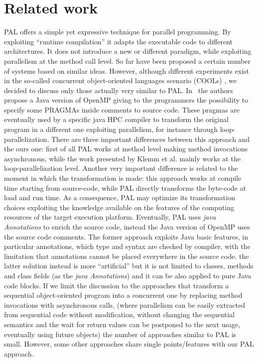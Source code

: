 \documentclass{acm_proc_article-sp}
\begin{document}
\section{Related work}\label{sec:rwork}
PAL offers a simple yet expressive technique for parallel programming. By exploiting ``runtime compilation'' it adapts the executable code to different architectures. It does not introduce a new or different paradigm, while exploiting parallelism at the method call level. So far have been proposed a certain number of systems based on similar ideas.
However, although different experiments exist in the so-called concurrent object-oriented languages scenario (COOLs) \cite{philippsen00survey}, we decided to discuss only those actually very similar to PAL.
In \cite{JavaOpenMP}\ the authors propose a Java version of OpenMP giving to the programmers the possibility to specify some PRAGMAs inside comments to source code. These pragmas are eventually used by a specific java HPC compiler to transform the original program in a different one exploiting parallelism, for instance through loop-parallelization.
There are three important differences between this approach and the ours one: first of all PAL works at method level making method invocations asynchronous, while the work presented by Klemm et al. mainly works at the loop-parallelization level. Another very important difference is related to the moment in which the transformation is made: this approach works at compile time starting from source-code, while PAL directly transforms the byte-code at load and run time. As a consequence, PAL may optimize its transformation choices exploiting the knowledge available on the features of the computing resources of the target execution platform.
Eventually, PAL uses \textit{java Annotations} to enrich the source code, instead the Java version of OpenMP uses the source code comments. 
The former approach exploits Java basic features, in particular annotations, which type and syntax are checked by compiler, with the limitation that annotations cannot be placed everywhere in the source code. the latter solution instead is more ``artificial'' but it is not limited to classes, methods and class fields (as the \textit{java Annotations}) and it can be also applied to pure Java code blocks.
If we limit the discussion to the approaches that transform a sequential object-oriented program into a concurrent one by replacing method invocations with asynchronous calls, (where parallelism can be easily extracted from sequential code without modification, without changing the sequential semantics and the wait for return values can be postponed to the next usage, eventually using future objects) the number of approaches similar to PAL is small. However, some other approaches share single points/features with our PAL approach. 
\end{document}
